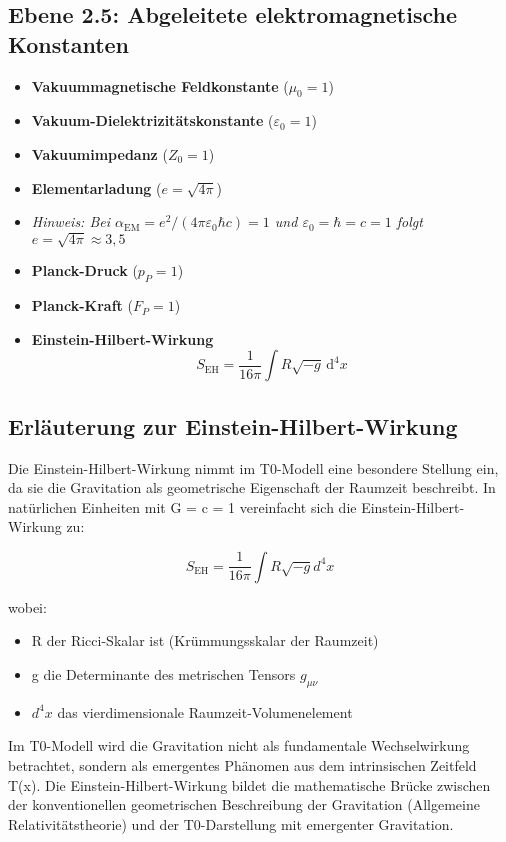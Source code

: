 \documentclass[12pt,a4paper]{article}
\newcommand{\alphaEM}{\alpha_{\text{EM}}}
\begin{document}
	\subsection*{Ebene 2.5: Abgeleitete elektromagnetische Konstanten}
	\begin{itemize}[itemsep=0.5em]
		\item \textbf{Vakuummagnetische Feldkonstante} (\(\mu_0 = 1\))
		\item \textbf{Vakuum-Dielektrizitätskonstante} (\(\varepsilon_0 = 1\))
		\item \textbf{Vakuumimpedanz} (\(Z_0 = 1\))
		\item \textbf{Elementarladung} (\(e = \sqrt{4\pi}\))
		\item[] \textit{Hinweis: Bei $\alphaEM = e^2/(4\pi\varepsilon_0\hbar c) = 1$ und $\varepsilon_0 = \hbar = c = 1$ folgt $e = \sqrt{4\pi} \approx 3,5$}
		\item \textbf{Planck-Druck} (\(p_P = 1\))
		\item \textbf{Planck-Kraft} (\(F_P = 1\))
		\item \textbf{Einstein-Hilbert-Wirkung} 
		\[
		S_{\mathrm{EH}} = \frac{1}{16\pi} \int R \sqrt{-g} \, \mathrm{d}^4x
		\]
	\end{itemize}
	
	\subsection*{Erläuterung zur Einstein-Hilbert-Wirkung}
	
	Die Einstein-Hilbert-Wirkung nimmt im T0-Modell eine besondere Stellung ein, da sie die Gravitation als geometrische Eigenschaft der Raumzeit beschreibt. In natürlichen Einheiten mit G = c = 1 vereinfacht sich die Einstein-Hilbert-Wirkung zu:
	
	\[
	S_{\mathrm{EH}} = \frac{1}{16\pi}\int R\sqrt{-g}d^4x
	\]
	
	wobei:
	\begin{itemize}
		\item R der Ricci-Skalar ist (Krümmungsskalar der Raumzeit)
		\item g die Determinante des metrischen Tensors $g_{\mu\nu}$
		\item $d^4x$ das vierdimensionale Raumzeit-Volumenelement
	\end{itemize}
	
	Im T0-Modell wird die Gravitation nicht als fundamentale Wechselwirkung betrachtet, sondern als emergentes Phänomen aus dem intrinsischen Zeitfeld T(x). Die Einstein-Hilbert-Wirkung bildet die mathematische Brücke zwischen der konventionellen geometrischen Beschreibung der Gravitation (Allgemeine Relativitätstheorie) und der T0-Darstellung mit emergenter Gravitation.
	
\end{document}
